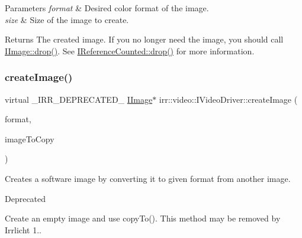 \begin{DoxyParams}{Parameters}
{\em format} & Desired color format of the image. \\
\hline
{\em size} & Size of the image to create. \\
\hline
\end{DoxyParams}
\begin{DoxyReturn}{Returns}
The created image. If you no longer need the image, you should call \hyperlink{classirr_1_1IReferenceCounted_a03856a09355b89d178090c4a5f738543}{I\+Image\+::drop()}. See \hyperlink{classirr_1_1IReferenceCounted_a03856a09355b89d178090c4a5f738543}{I\+Reference\+Counted\+::drop()} for more information. 
\end{DoxyReturn}
\mbox{\label{classirr_1_1video_1_1IVideoDriver_af92ef735bc8c755f5c201a52a70d05e8}} 
\subsubsection{\texorpdfstring{create\+Image()}{createImage()}\hspace{0.1cm}{\footnotesize\ttfamily [2/4]}}
{\footnotesize\ttfamily virtual \+\_\+\+I\+R\+R\+\_\+\+D\+E\+P\+R\+E\+C\+A\+T\+E\+D\+\_\+ \hyperlink{classirr_1_1video_1_1IImage}{I\+Image}$\ast$ irr\+::video\+::\+I\+Video\+Driver\+::create\+Image (\begin{DoxyParamCaption}\item[{\hyperlink{namespaceirr_1_1video_a1d5e487888c32b1674a8f75116d829ed}{E\+C\+O\+L\+O\+R\+\_\+\+F\+O\+R\+M\+AT}}]{format,  }\item[{\hyperlink{classirr_1_1video_1_1IImage}{I\+Image} $\ast$}]{image\+To\+Copy }\end{DoxyParamCaption})\hspace{0.3cm}{\ttfamily [pure virtual]}}



Creates a software image by converting it to given format from another image. 

\begin{DoxyRefDesc}{Deprecated}
\item[\hyperlink{deprecated__deprecated000023}{Deprecated}]Create an empty image and use copy\+To(). This method may be removed by Irrlicht 1.. \end{DoxyRefDesc}

